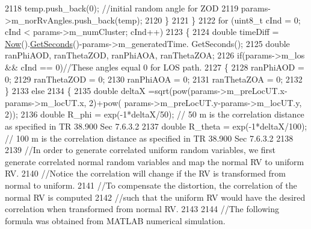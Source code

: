 \begin{DoxyCode}
2118                                 temp.push\_back(0); \textcolor{comment}{//initial random angle for ZOD}
2119                                 params->m\_norRvAngles.push\_back(temp);
2120                         \}
2121                 \}
2122                 \textcolor{keywordflow}{for} (uint8\_t cInd = 0; cInd < params->m\_numCluster; cInd++)
2123                 \{
2124                         \textcolor{keywordtype}{double}  timeDiff = \hyperlink{group__simulator_gac3635e2e87f7ce316c89290ee1b01d0d}{Now}().\hyperlink{classns3_1_1Time_a8f20d5c3b0902d7b4320982f340b57c8}{GetSeconds}()-params->m\_generatedTime.
      GetSeconds();
2125                         \textcolor{keywordtype}{double} ranPhiAOD, ranThetaZOD, ranPhiAOA, ranThetaZOA;
2126                         \textcolor{keywordflow}{if}(params->m\_los && cInd == 0)\textcolor{comment}{//These angles equal 0 for LOS path.}
2127                         \{
2128                                 ranPhiAOD = 0;
2129                                 ranThetaZOD = 0;
2130                                 ranPhiAOA = 0;
2131                                 ranThetaZOA = 0;
2132                         \}
2133                         \textcolor{keywordflow}{else}
2134                         \{
2135                                 \textcolor{keywordtype}{double} deltaX =sqrt(pow(params->m\_preLocUT.x-params->m\_locUT.x, 2)+pow(
      params->m\_preLocUT.y-params->m\_locUT.y, 2));
2136                                 \textcolor{keywordtype}{double} R\_phi = exp(-1*deltaX/50); \textcolor{comment}{// 50 m is the correlation distance as
       specified in TR 38.900 Sec 7.6.3.2}
2137                                 \textcolor{keywordtype}{double} R\_theta = exp(-1*deltaX/100); \textcolor{comment}{// 100 m is the correlation distance
       as specified in TR 38.900 Sec 7.6.3.2}
2138 
2139                                 \textcolor{comment}{//In order to generate correlated uniform random variables, we first
       generate correlated normal random variables and map the normal RV to uniform RV.}
2140                                 \textcolor{comment}{//Notice the correlation will change if the RV is transformed from normal
       to uniform.}
2141                                 \textcolor{comment}{//To compensate the distortion, the correlation of the normal RV is
       computed}
2142                                 \textcolor{comment}{//such that the uniform RV would have the desired correlation when
       transformed from normal RV.}
2143 
2144                                 \textcolor{comment}{//The following formula was obtained from MATLAB numerical simulation.}

\end{DoxyCode}
